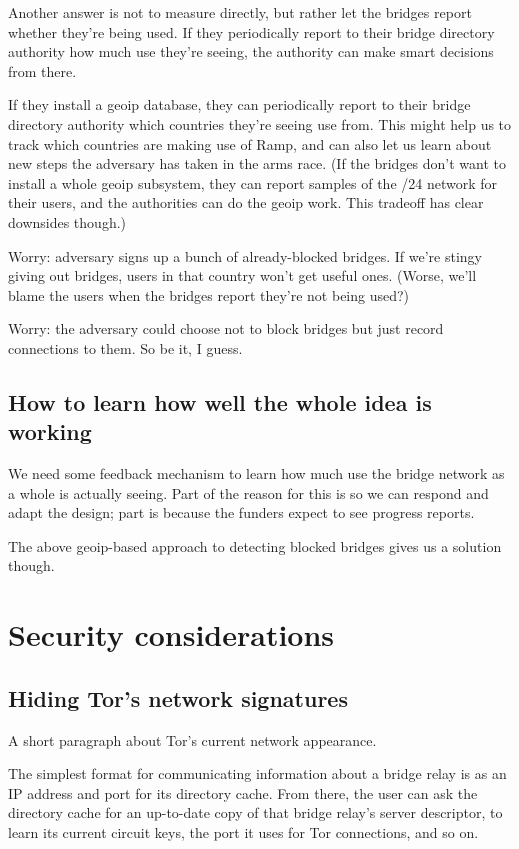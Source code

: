 \documentclass{llncs}
\begin{document}
Another answer is not to measure directly, but rather let the bridges
report whether they're being used. If they periodically report to their
bridge directory authority how much use they're seeing, the authority
can make smart decisions from there.

If they install a geoip database, they can periodically report to their
bridge directory authority which countries they're seeing use from. This
might help us to track which countries are making use of Ramp, and can
also let us learn about new steps the adversary has taken in the arms
race. (If the bridges don't want to install a whole geoip subsystem, they
can report samples of the /24 network for their users, and the authorities
can do the geoip work. This tradeoff has clear downsides though.)

Worry: adversary signs up a bunch of already-blocked bridges. If we're
stingy giving out bridges, users in that country won't get useful ones.
(Worse, we'll blame the users when the bridges report they're not
being used?)

Worry: the adversary could choose not to block bridges but just record
connections to them. So be it, I guess.

\subsection{How to learn how well the whole idea is working}

We need some feedback mechanism to learn how much use the bridge network
as a whole is actually seeing. Part of the reason for this is so we can
respond and adapt the design; part is because the funders expect to see
progress reports.

The above geoip-based approach to detecting blocked bridges gives us a
solution though.


\section{Security considerations}
\label{sec:security}

\subsection{Hiding Tor's network signatures}
\label{subsec:enclave-dirs}

A short paragraph about Tor's current network appearance.

The simplest format for communicating information about a bridge relay
is as an IP address and port for its directory cache. From there, the
user can ask the directory cache for an up-to-date copy of that bridge
relay's server descriptor, to learn its current circuit keys, the port
it uses for Tor connections, and so on.
\end{document}
